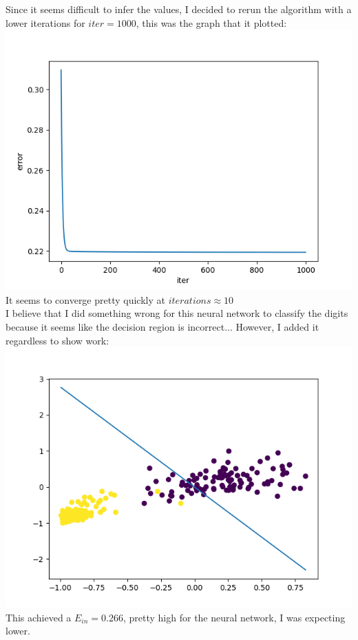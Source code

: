\documentclass{article}
\begin{document}
\begin{enumerate}
\begin{enumerate}
            Since it seems difficult to infer the values, I decided to rerun the algorithm with a lower iterations for $iter = 1000$, this was the graph that it plotted:\\\includegraphics[scale=0.5]{images/2a2.png}\\
            It seems to converge pretty quickly at $iterations \approx 10$\\
            I believe that I did something wrong for this neural network to classify the digits because it seems like the decision region is incorrect... However, I added it regardless to show work:\\\includegraphics[scale=0.5]{images/2a3.png}\\This achieved a $E_{in} = 0.266$, pretty high for the neural network, I was expecting lower.

\end{enumerate}
\end{enumerate}
\end{document}
